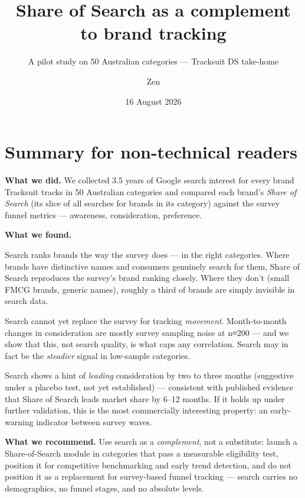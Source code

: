 \documentclass[
]{article}
\title{Share of Search as a complement to brand tracking}
\subtitle{A pilot study on 50 Australian categories --- Tracksuit DS
take-home}
\author{Zen}
\date{16 August 2026}
\begin{document}
\maketitle

{
\setcounter{tocdepth}{2}
\tableofcontents
}
\hypertarget{summary-for-non-technical-readers}{%
\section*{Summary for non-technical
readers}\label{summary-for-non-technical-readers}}

\textbf{What we did.} We collected 3.5 years of Google search interest
for every brand Tracksuit tracks in 50 Australian categories and
compared each brand's \emph{Share of Search} (its slice of all searches
for brands in its category) against the survey funnel metrics ---
awareness, consideration, preference.

\textbf{What we found.}

Search ranks brands the way the survey does --- in the right categories.
Where brands have distinctive names and consumers genuinely search for
them, Share of Search reproduces the survey's brand ranking closely.
Where they don't (small FMCG brands, generic names), roughly a third of
brands are simply invisible in search data.

Search cannot yet replace the survey for tracking \emph{movement}.
Month-to-month changes in consideration are mostly survey sampling noise
at n≈200 --- and we show that this, not search quality, is what caps any
correlation. Search may in fact be the \emph{steadier} signal in
low-sample categories.

Search shows a hint of \emph{leading} consideration by two to three
months (suggestive under a placebo test, not yet established) ---
consistent with published evidence that Share of Search leads market
share by 6--12 months. If it holds up under further validation, this is
the most commercially interesting property: an early-warning indicator
between survey waves.

\textbf{What we recommend.} Use search as a \emph{complement}, not a
substitute: launch a Share-of-Search module in categories that pass a
measurable eligibility test, position it for competitive benchmarking
and early trend detection, and do not position it as a replacement for
survey-based funnel tracking --- search carries no demographics, no
funnel stages, and no absolute levels.
\end{document}
